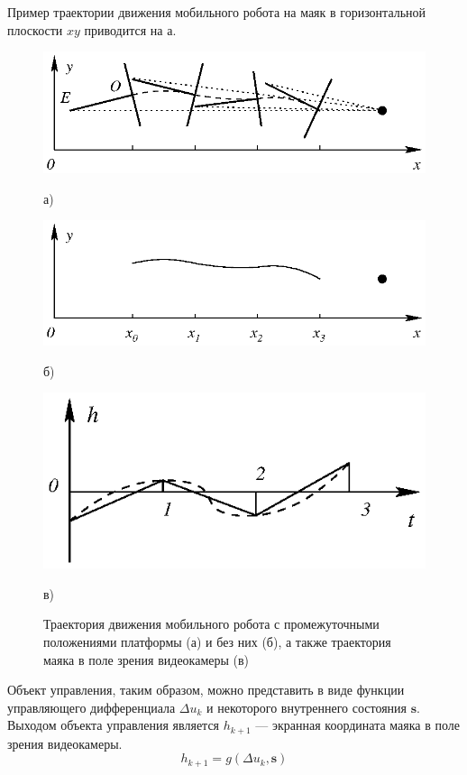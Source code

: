 Пример траектории движения мобильного робота на маяк в горизонтальной
плоскости $xy$ приводится на а.
\begin{figure}
\centerline{\includegraphics{moby_trajectory_a}}
\centerline{а)}
\centerline{\includegraphics{moby_trajectory_b}}
\centerline{б)}
\centerline{\includegraphics{moby_trajectory_c}}
\centerline{в)}
\caption{Траектория движения мобильного робота с промежуточными положениями
         платформы (а) и без них (б), а также траектория маяка в поле зрения
         видеокамеры (в)}
\label{fig:moby_trajectory}
\end{figure}

Объект управления, таким образом, можно представить в виде функции
управляющего дифференциала $\Delta u_k$ и некоторого внутреннего
состояния $\mathbf{s}$.  Выходом объекта управления является $h_{k+1}$
--- экранная координата маяка в поле зрения видеокамеры.
\begin{equation}\label{eq:mobot-function}
h_{k+1}=g(\Delta u_k, \mathbf{s})
\end{equation}

